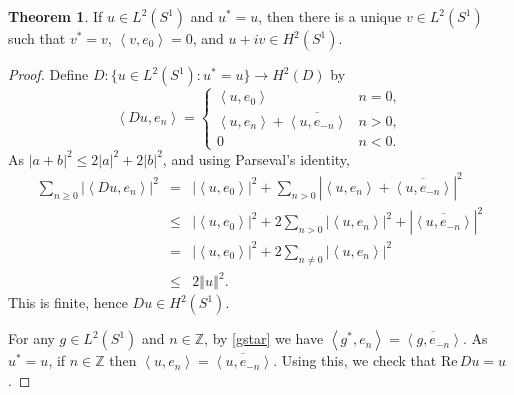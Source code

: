\documentclass{article}
\newcommand{\inner}[2]{\left\langle #1, #2 \right\rangle}
\def\Re{\ensuremath{\mathrm{Re}}\,}
\newcommand{\norm}[1]{\left\Vert #1 \right\Vert}
\theoremstyle{definition}
\newtheorem{theorem}{Theorem}
\begin{document}
\begin{theorem}
If $u \in L^2(S^1)$ and $u^*=u$, then there is a unique $v \in L^2(S^1)$ such that $v^*=v$, $\inner{v}{e_0}=0$, and $u+iv \in H^2(S^1)$.
\end{theorem}
\begin{proof}
Define $D:\{u \in L^2(S^1): u^*=u\} \to H^2(D)$ by 
\[
\inner{Du}{e_n}=\begin{cases}
\inner{u}{e_0}&n=0,\\
\inner{u}{e_n}+\overline{\inner{u}{e_{-n}}}&n>0,\\
0&n<0.
\end{cases}
\]
As $|a+b|^2 \leq 2|a|^2  + 2|b|^2$, and using Parseval's identity,
\begin{eqnarray*}
\sum_{n \geq 0} |\inner{Du}{e_n}|^2&=&|\inner{u}{e_0}|^2 + \sum_{n>0} |\inner{u}{e_n}+\overline{\inner{u}{e_{-n}}}|^2\\
&\leq&|\inner{u}{e_0}|^2 + 2 \sum_{n>0} |\inner{u}{e_n}|^2 + |\overline{\inner{u}{e_{-n}}}|^2\\
&=&|\inner{u}{e_0}|^2 + 2\sum_{n \neq 0}  |\inner{u}{e_n}|^2\\
&\leq&2\norm{u}^2.
\end{eqnarray*}
This is finite, hence $Du \in H^2(S^1)$.

For any $g \in L^2(S^1)$ and $n \in \mathbb{Z}$, by \eqref{gstar} we have $\inner{g^*}{e_n}=\overline{\inner{g}{e_{-n}}}$. As $u^*=u$,
if $n \in \mathbb{Z}$ then $\inner{u}{e_n}=\overline{\inner{u}{e_{-n}}}$. Using this, we check that $\Re Du=u$.


\end{proof}
\end{document}
